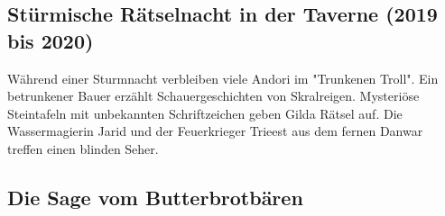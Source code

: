 \begin{chapterbox}
    \chapter{Stürmische Rätselnacht in der Taverne (2019 bis 2020)}
    \label{2019-2020-stuermische-raetselnacht-in-der-taverne}


    Während einer Sturmnacht verbleiben viele Andori im "Trunkenen Troll". Ein betrunkener Bauer erzählt Schauergeschichten von Skralreigen. Mysteriöse Steintafeln mit unbekannten Schriftzeichen geben Gilda Rätsel auf. Die Wassermagierin Jarid und der Feuerkrieger Trieest aus dem fernen Danwar treffen einen blinden Seher.


    
\end{chapterbox}


\newpage
\section{Die Sage vom Butterbrotbären}


